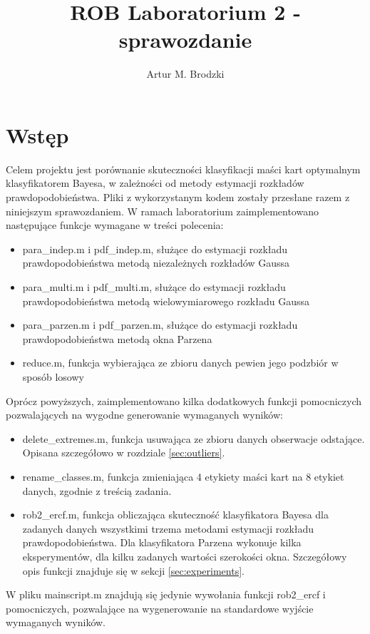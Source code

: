 \documentclass{article}
\title{ROB Laboratorium 2 - sprawozdanie}
\author{Artur M. Brodzki}
\begin{document}
	\maketitle
	
	\section{Wstęp} \label{sec:intro}
	Celem projektu jest porównanie skuteczności klasyfikacji maści kart optymalnym klasyfikatorem Bayesa, w zależności od metody estymacji rozkładów prawdopodobieństwa. Pliki z wykorzystanym kodem zostały przesłane razem z niniejszym sprawozdaniem. W ramach laboratorium zaimplementowano następujące funkcje wymagane w treści polecenia:
	\begin{itemize}
		\item para\_indep.m i pdf\_indep.m, służące do estymacji rozkładu prawdopodobieństwa metodą niezależnych rozkładów Gaussa
		\item para\_multi.m i pdf\_multi.m, służące do estymacji rozkładu prawdopodobieństwa metodą wielowymiarowego rozkładu Gaussa
		\item para\_parzen.m i pdf\_parzen.m, służące do estymacji rozkładu prawdopodobieństwa metodą okna Parzena
		\item reduce.m, funkcja wybierająca ze zbioru danych pewien jego podzbiór w sposób losowy
	\end{itemize}
	Oprócz powyższych, zaimplementowano kilka dodatkowych funkcji pomocniczych pozwalających na wygodne generowanie wymaganych wyników:
	\begin{itemize}
		\item delete\_extremes.m, funkcja usuwająca ze zbioru danych obserwacje odstające. Opisana szczegółowo w rozdziale \ref{sec:outliers}. 
		\item rename\_classes.m, funkcja zmieniająca 4 etykiety maści kart na 8 etykiet danych, zgodnie z treścią zadania. 
		\item rob2\_ercf.m, funkcja obliczająca skuteczność klasyfikatora Bayesa dla zadanych danych wszystkimi trzema metodami estymacji rozkładu prawdopodobieństwa. Dla klasyfikatora Parzena wykonuje kilka eksperymentów, dla kilku zadanych wartości szerokości okna. Szczegółowy opis funkcji znajduje się w sekcji \ref{sec:experiments}. 
	\end{itemize}
	W pliku mainscript.m znajdują się jedynie wywołania funkcji rob2\_ercf i pomocniczych, pozwalające na wygenerowanie na standardowe wyjście wymaganych wyników. 
	
\end{document}
